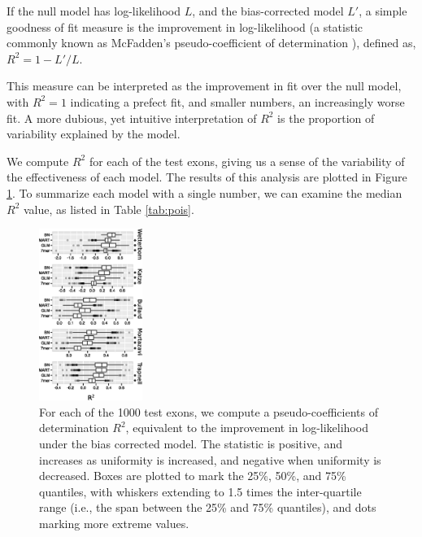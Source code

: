 \documentclass{bioinfo}
\begin{document}
If the null model has log-likelihood $L$, and the bias-corrected model $L'$, a
simple goodness of fit measure is the improvement in log-likelihood (a statistic
commonly known as McFadden's pseudo-coefficient of determination
\citep{McFadden1974}), defined as,
$R^2 = 1 - L'/L$.

This measure can be interpreted as the improvement in fit over the null model,
with $R^2 = 1$ indicating a prefect fit, and smaller numbers, an increasingly
worse fit. A more dubious, yet intuitive interpretation of $R^2$ is the
proportion of variability explained by the model.

We compute $R^2$ for each of the test exons, giving us a sense of the variability
of the effectiveness of each model. The results of this analysis are plotted in
Figure \ref{fig:pois}.  To summarize each model with a single number, we can
examine the median $R^2$ value, as listed in Table \ref{tab:pois}.

\begin{figure}
\centerline{\includegraphics[width=0.30\textwidth]{pois-boxplot.eps}}
\caption{For each of the 1000 test exons, we compute a pseudo-coefficients of
determination $R^2$, equivalent to the improvement in log-likelihood under the
bias corrected model. The statistic is positive, and increases as uniformity is
increased, and negative when uniformity is decreased. Boxes are plotted to mark
the 25\%, 50\%, and 75\% quantiles, with whiskers extending to 1.5 times the
inter-quartile range (i.e., the span between the 25\% and 75\% quantiles), and
dots marking more extreme values.
}


    \label{fig:pois}
\end{figure}
\end{document}
